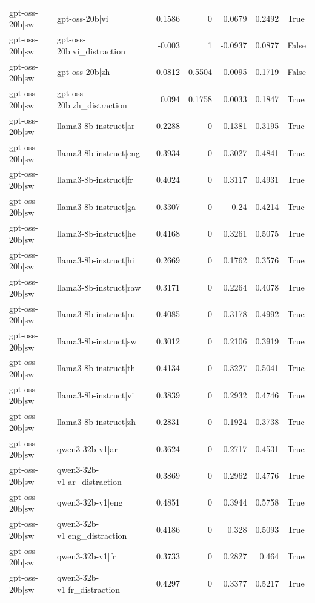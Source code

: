 \begin{table}
\begin{tabular}{l l r r r r l}
gpt-oss-20b|sw & gpt-oss-20b|vi & 0.1586 & 0 & 0.0679 & 0.2492 & True \\
gpt-oss-20b|sw & gpt-oss-20b|vi_distraction & -0.003 & 1 & -0.0937 & 0.0877 & False \\
gpt-oss-20b|sw & gpt-oss-20b|zh & 0.0812 & 0.5504 & -0.0095 & 0.1719 & False \\
gpt-oss-20b|sw & gpt-oss-20b|zh_distraction & 0.094 & 0.1758 & 0.0033 & 0.1847 & True \\
gpt-oss-20b|sw & llama3-8b-instruct|ar & 0.2288 & 0 & 0.1381 & 0.3195 & True \\
gpt-oss-20b|sw & llama3-8b-instruct|eng & 0.3934 & 0 & 0.3027 & 0.4841 & True \\
gpt-oss-20b|sw & llama3-8b-instruct|fr & 0.4024 & 0 & 0.3117 & 0.4931 & True \\
gpt-oss-20b|sw & llama3-8b-instruct|ga & 0.3307 & 0 & 0.24 & 0.4214 & True \\
gpt-oss-20b|sw & llama3-8b-instruct|he & 0.4168 & 0 & 0.3261 & 0.5075 & True \\
gpt-oss-20b|sw & llama3-8b-instruct|hi & 0.2669 & 0 & 0.1762 & 0.3576 & True \\
gpt-oss-20b|sw & llama3-8b-instruct|raw & 0.3171 & 0 & 0.2264 & 0.4078 & True \\
gpt-oss-20b|sw & llama3-8b-instruct|ru & 0.4085 & 0 & 0.3178 & 0.4992 & True \\
gpt-oss-20b|sw & llama3-8b-instruct|sw & 0.3012 & 0 & 0.2106 & 0.3919 & True \\
gpt-oss-20b|sw & llama3-8b-instruct|th & 0.4134 & 0 & 0.3227 & 0.5041 & True \\
gpt-oss-20b|sw & llama3-8b-instruct|vi & 0.3839 & 0 & 0.2932 & 0.4746 & True \\
gpt-oss-20b|sw & llama3-8b-instruct|zh & 0.2831 & 0 & 0.1924 & 0.3738 & True \\
gpt-oss-20b|sw & qwen3-32b-v1|ar & 0.3624 & 0 & 0.2717 & 0.4531 & True \\
gpt-oss-20b|sw & qwen3-32b-v1|ar_distraction & 0.3869 & 0 & 0.2962 & 0.4776 & True \\
gpt-oss-20b|sw & qwen3-32b-v1|eng & 0.4851 & 0 & 0.3944 & 0.5758 & True \\
gpt-oss-20b|sw & qwen3-32b-v1|eng_distraction & 0.4186 & 0 & 0.328 & 0.5093 & True \\
gpt-oss-20b|sw & qwen3-32b-v1|fr & 0.3733 & 0 & 0.2827 & 0.464 & True \\
gpt-oss-20b|sw & qwen3-32b-v1|fr_distraction & 0.4297 & 0 & 0.3377 & 0.5217 & True \\

\end{tabular}
\end{table}
